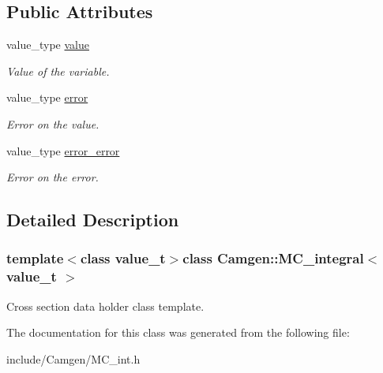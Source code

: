 \subsection*{Public Attributes}
\begin{DoxyCompactItemize}
\item 
\hypertarget{a00363_af157bc06b6f02f9b493d55b2e3ed15fc}{value\-\_\-type \hyperlink{a00363_af157bc06b6f02f9b493d55b2e3ed15fc}{value}}\label{a00363_af157bc06b6f02f9b493d55b2e3ed15fc}

\begin{DoxyCompactList}\small\item\em Value of the variable. \end{DoxyCompactList}\item 
\hypertarget{a00363_a58f93d53de2819a07d63c2f69a512536}{value\-\_\-type \hyperlink{a00363_a58f93d53de2819a07d63c2f69a512536}{error}}\label{a00363_a58f93d53de2819a07d63c2f69a512536}

\begin{DoxyCompactList}\small\item\em Error on the value. \end{DoxyCompactList}\item 
\hypertarget{a00363_a56de2f410ea5d3702790a2c65b89f858}{value\-\_\-type \hyperlink{a00363_a56de2f410ea5d3702790a2c65b89f858}{error\-\_\-error}}\label{a00363_a56de2f410ea5d3702790a2c65b89f858}

\begin{DoxyCompactList}\small\item\em Error on the error. \end{DoxyCompactList}\end{DoxyCompactItemize}


\subsection{Detailed Description}
\subsubsection*{template$<$class value\-\_\-t$>$class Camgen\-::\-M\-C\-\_\-integral$<$ value\-\_\-t $>$}

Cross section data holder class template. 

The documentation for this class was generated from the following file\-:\begin{DoxyCompactItemize}
\item 
include/\-Camgen/M\-C\-\_\-int.\-h\end{DoxyCompactItemize}
